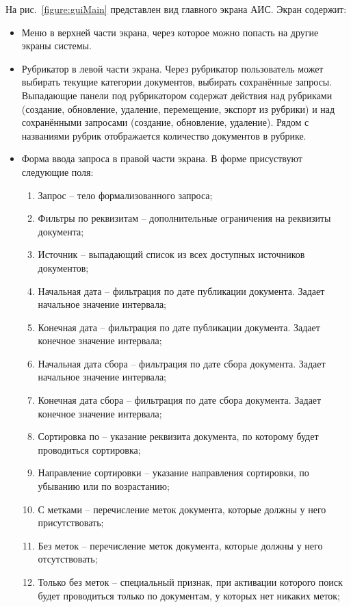   На рис.~\ref{figure:guiMain} представлен вид главного экрана АИС. Экран содержит:
  \begin{itemize}
  \item Меню в верхней части экрана, через которое можно попасть на другие экраны системы.
  \item Рубрикатор в левой части экрана. Через рубрикатор пользователь может выбирать текущие категории документов, выбирать сохранённые запросы. Выпадающие панели под рубрикатором содержат действия над рубриками (создание, обновление, удаление, перемещение, экспорт из рубрики) и над сохранёнными запросами (создание, обновление, удаление). Рядом с названиями рубрик отображается количество документов в рубрике.
  \item Форма ввода запроса в правой части экрана. В форме присуствуют следующие поля:
  \begin{enumerate}
  \item Запрос -- тело формализованного запроса;
  \item Фильтры по реквизитам -- дополнительные ограничения на реквизиты документа;
  \item Источник -- выпадающий список из всех доступных источников документов;
  \item Начальная дата -- фильтрация по дате публикации документа. Задает начальное значение интервала;
  \item Конечная дата -- фильтрация по дате публикации документа. Задает конечное значение интервала;
  \item Начальная дата сбора -- фильтрация по дате сбора документа. Задает начальное значение интервала;
  \item Конечная дата сбора -- фильтрация по дате сбора документа. Задает конечное значение интервала;
  \item Сортировка по -- указание реквизита документа, по которому будет проводиться сортировка;
  \item Направление сортировки -- указание направления сортировки, по убыванию или по возрастанию;
  \item С метками -- перечисление меток документа, которые должны у него присутствовать;
  \item Без меток -- перечисление меток документа, которые должны у него отсутствовать;
  \item Только без меток -- специальный признак, при активации которого поиск будет проводиться только по документам, у которых нет никаких меток;
  \end{enumerate}

  \end{itemize}

